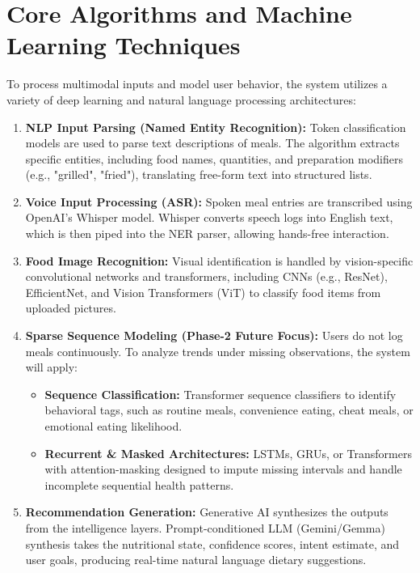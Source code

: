 \documentclass[12pt,a4paper,oneside]{report}
\begin{document}
\section{Core Algorithms and Machine Learning Techniques}
To process multimodal inputs and model user behavior, the system utilizes a variety of deep learning and natural language processing architectures:
\begin{enumerate}
    \item \textbf{NLP Input Parsing (Named Entity Recognition):} Token classification models are used to parse text descriptions of meals. The algorithm extracts specific entities, including food names, quantities, and preparation modifiers (e.g., "grilled", "fried"), translating free-form text into structured lists.
    \item \textbf{Voice Input Processing (ASR):} Spoken meal entries are transcribed using OpenAI's Whisper model. Whisper converts speech logs into English text, which is then piped into the NER parser, allowing hands-free interaction.
    \item \textbf{Food Image Recognition:} Visual identification is handled by vision-specific convolutional networks and transformers, including CNNs (e.g., ResNet), EfficientNet, and Vision Transformers (ViT) to classify food items from uploaded pictures.
    \item \textbf{Sparse Sequence Modeling (Phase-2 Future Focus):} Users do not log meals continuously. To analyze trends under missing observations, the system will apply:
    \begin{itemize}
        \item \textbf{Sequence Classification:} Transformer sequence classifiers to identify behavioral tags, such as routine meals, convenience eating, cheat meals, or emotional eating likelihood.
        \item \textbf{Recurrent \& Masked Architectures:} LSTMs, GRUs, or Transformers with attention-masking designed to impute missing intervals and handle incomplete sequential health patterns.
    \end{itemize}
    \item \textbf{Recommendation Generation:} Generative AI synthesizes the outputs from the intelligence layers. Prompt-conditioned LLM (Gemini/Gemma) synthesis takes the nutritional state, confidence scores, intent estimate, and user goals, producing real-time natural language dietary suggestions.
\end{enumerate}
\end{document}
